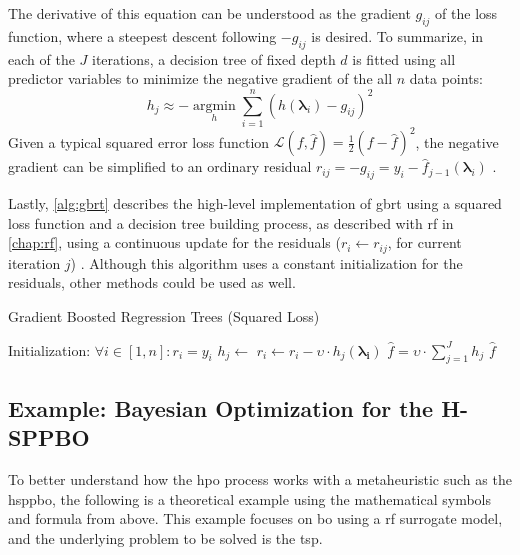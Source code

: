 The derivative of this equation can be understood as the gradient $g_{ij}$ of the loss function, where a steepest descent following $-g_{ij}$ is desired. To summarize, in each of the $J$ iterations, a decision tree of fixed depth $d$ is fitted using all predictor variables to minimize the negative gradient of the all $n$ data points:
\begin{equation}
	h_j \approx -\operatorname*{argmin}_{h} \sum_{i=1}^{n} (h(\mathbf{\lambda}_i) - g_{ij})^2
\end{equation}
Given a typical squared error loss function $\mathcal{L}(f, \hat{f}) = \frac{1}{2}(f - \hat{f})^2$, the negative gradient can be simplified to an ordinary residual $r_{ij} = -g_{ij} = y_i - \hat{f}_{j-1}(\mathbf{\lambda}_i)$ \cite[Chapter~10]{hastie2009elements}.

Lastly, \cref{alg:gbrt} describes the high-level implementation of \gls{gbrt} using a squared loss function and a decision tree building process, as described with \gls{rf} in \cref{chap:rf}, using a continuous update for the residuals ($r_{i} \gets r_{ij}$, for current iteration $j$) \cite{mohan2011web}.
Although this algorithm uses a constant initialization for the residuals, other methods could be used as well.

\begin{algorithm}
	\caption{Gradient Boosted Regression Trees (Squared Loss)}
	\label{alg:gbrt}
	\begin{algorithmic}
		\State Initialization: $\forall i \in [1,n]: r_i = y_i$
			\State$h_j \gets$ 
				\State $r_i \gets r_i - \upsilon \cdot h_j(\mathbf{\lambda_i})$
			\EndFor
		\EndFor
		\State $\hat{f} = \upsilon \cdot \sum_{j=1}^{J} h_j$
		\State \Return $\hat{f}$
	\end{algorithmic}
\end{algorithm}


\subsection{Example: Bayesian Optimization for the H-SPPBO}
To better understand how the \glsdesc{hpo} process works with a metaheuristic such as the \gls{hsppbo}, the following is a theoretical example using the mathematical symbols and formula from above. This example focuses on \gls{bo} using a \gls{rf} surrogate model, and the underlying problem to be solved is the \gls{tsp}.

